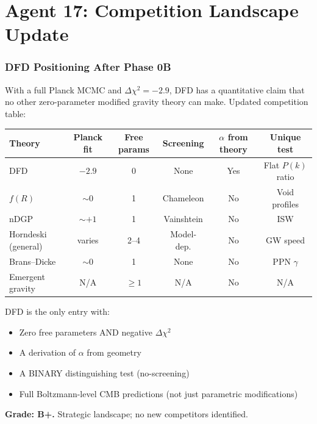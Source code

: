\documentclass[11pt,a4paper]{article}
\begin{document}
\part{Agent 17: Competition Landscape Update}
\label{part:competition}

\section{DFD Positioning After Phase 0B}

With a full Planck MCMC and $\Delta\chi^2 = -2.9$, DFD has a quantitative claim that no other zero-parameter modified gravity theory can make. Updated competition table:

\begin{center}
\begin{longtable}{p{3cm}ccccc}
\toprule
\textbf{Theory} & \textbf{Planck fit} & \textbf{Free params} & \textbf{Screening} & \textbf{$\alpha$ from theory} & \textbf{Unique test} \\
\midrule
DFD & $-2.9$ & 0 & None & Yes & Flat $P(k)$ ratio \\
$f(R)$ & $\sim 0$ & 1 & Chameleon & No & Void profiles \\
nDGP & $\sim +1$ & 1 & Vainshtein & No & ISW \\
Horndeski (general) & varies & 2--4 & Model-dep. & No & GW speed \\
Brans--Dicke & $\sim 0$ & 1 & None & No & PPN $\gamma$ \\
Emergent gravity & N/A & $\geq 1$ & N/A & No & N/A \\
\bottomrule
\end{longtable}
\end{center}

DFD is the only entry with:
\begin{itemize}
\item Zero free parameters AND negative $\Delta\chi^2$
\item A derivation of $\alpha$ from geometry
\item A BINARY distinguishing test (no-screening)
\item Full Boltzmann-level CMB predictions (not just parametric modifications)
\end{itemize}

\begin{tcolorbox}[colback=green!5!white, colframe=green!60!black, title={Agent 17: DFD Uniquely Positioned --- Zero-Parameter, Better Fit, Binary Test}]
\textbf{Grade: B+.} Strategic landscape; no new competitors identified.
\end{tcolorbox}
\end{document}
